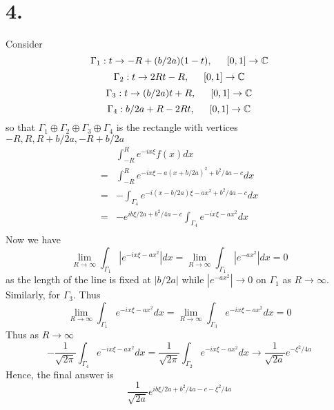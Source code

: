 \documentclass[11pt]{article}
\theoremstyle{mystyle}
\theoremstyle{definition}
\begin{document}
\section*{4.}
Consider 
\[
  \Gamma_1: t \to -R + (b/2a)(1-t), \indent [0,1] \to \mathbb{C}
\]
\[
  \Gamma_2: t \to 2Rt - R, \indent [0,1] \to \mathbb{C}
\]
\[
  \Gamma_3: t \to (b/2a)t + R, \indent [0,1] \to \mathbb{C}
\]
\[
  \Gamma_4: b/2a + R - 2Rt, \indent [0,1] \to \mathbb{C}
\]
so that $\Gamma_1 \oplus \Gamma_2 \oplus \Gamma_3 \oplus \Gamma_4$ is the rectangle with vertices $-R, R, R+b/2a, -R+b/2a$
\begin{align*}
  & \int_{-R}^R e^{-ix\xi} f(x) dx \\
  =& \int_{-R}^R e^{-ix\xi -a(x+b/2a)^2 + b^2/4a - c} dx \\
  =& -\int_{\Gamma_4} e^{-i(x-b/2a)\xi - ax^2 + b^2/4a - c} dx \\
  =& - e^{ib\xi/2a +b^2/4a - c} \int_{\Gamma_4} e^{-ix \xi - ax^2} dx \\
\end{align*}
Now we have 
\[
  \lim_{R \to \infty} \int_{\Gamma_1}| e^{-ix\xi -ax^2}| dx = 
  \lim_{R \to \infty} \int_{\Gamma_1}| e^{-ax^2}| dx = 0 
\]
as the length of the line is fixed at $|b/2a|$ while $|e^{-ax^2}| \to 0$ on $\Gamma_1$ as $R \to \infty$. Similarly, for $\Gamma_3$. Thus 
\[
  \lim_{R \to \infty} \int_{\Gamma_1} e^{-ix\xi -ax^2} dx = 
  \lim_{R \to \infty} \int_{\Gamma_3} e^{-ix\xi -ax^2} dx = 0
\] 
Thus as $R \to \infty$ 
\[
  -\displaystyle\frac{1}{\sqrt{2\pi}}\int_{\Gamma_4} e^{-ix \xi - ax^2} dx = \displaystyle\frac{1}{\sqrt{2\pi}}\int_{\Gamma_2} e^{-ix \xi - ax^2} dx \to \displaystyle\frac{1}{\sqrt{2a}} e^{-\xi^2/4a}
\]
Hence, the final answer is 
\[
  \displaystyle\frac{1}{\sqrt{2a}}e^{ib\xi/2a + b^2/4a - c - \xi^2/4a}
\]
\clearpage 
\end{document}
